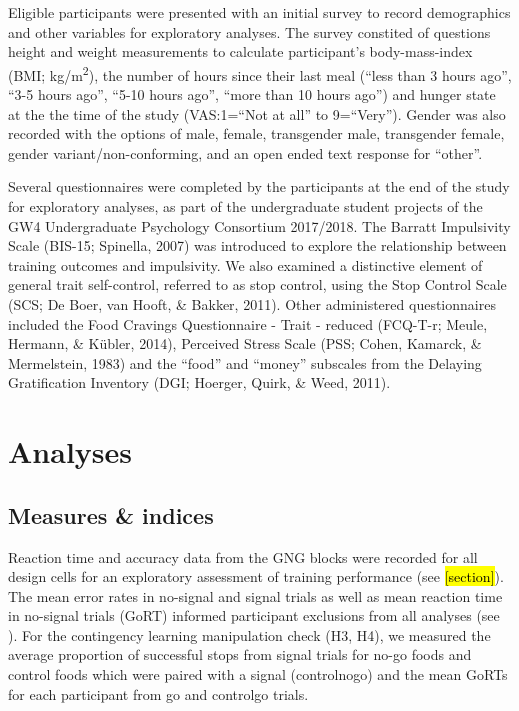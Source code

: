 \documentclass[man,floatsintext]{apa6}
\begin{document}
\par

Eligible participants were presented with an initial survey to record demographics and other variables for exploratory analyses. The survey constited of questions height and weight measurements to calculate participant's body-mass-index (BMI; kg/m\textsuperscript{2}), the number of hours since their last meal (\enquote{less than 3 hours ago}, \enquote{3-5 hours ago}, \enquote{5-10 hours ago}, \enquote{more than 10 hours ago}) and hunger state at the the time of the study (VAS:1=\enquote{Not at all} to 9=\enquote{Very}). Gender was also recorded with the options of male, female, transgender male, transgender female, gender variant/non-conforming, and an open ended text response for \enquote{other}.

\par

Several questionnaires were completed by the participants at the end of the study for exploratory analyses, as part of the undergraduate student projects of the GW4 Undergraduate Psychology Consortium 2017/2018. The Barratt Impulsivity Scale (BIS-15; Spinella, 2007) was introduced to explore the relationship between training outcomes and impulsivity. We also examined a distinctive element of general trait self-control, referred to as stop control, using the Stop Control Scale (SCS; De Boer, van Hooft, \& Bakker, 2011). Other administered questionnaires included the Food Cravings Questionnaire - Trait - reduced (FCQ-T-r; Meule, Hermann, \& Kübler, 2014), Perceived Stress Scale (PSS; Cohen, Kamarck, \& Mermelstein, 1983) and the \enquote{food} and \enquote{money} subscales from the Delaying Gratification Inventory (DGI; Hoerger, Quirk, \& Weed, 2011).

\hypertarget{analyses}{%
\section{Analyses}\label{analyses}}

\hypertarget{measures-indices}{%
\subsection{Measures \& indices}\label{measures-indices}}

\par

Reaction time and accuracy data from the GNG blocks were recorded for all design cells for an exploratory assessment of training performance (see \hl{[section]}). The mean error rates in no-signal and signal trials as well as mean reaction time in no-signal trials (GoRT) informed participant exclusions from all analyses (see \textit{}). For the contingency learning manipulation check (H3, H4), we measured the average proportion of successful stops from signal trials for no-go foods and control foods which were paired with a signal (controlnogo) and the mean GoRTs for each participant from go and controlgo trials.
\end{document}
